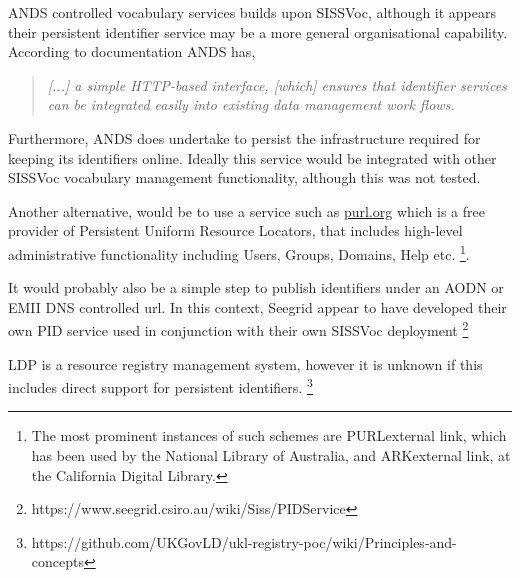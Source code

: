 \documentclass[10pt,a4paper]{article}
\newenvironment{italicquotes}
{\begin{quote}\itshape}
{\end{quote}}
\begin{document}
\begin{flushleft}
  \item ANDS controlled vocabulary services builds upon SISSVoc, although it appears
  their persistent identifier service may be a more general organisational capability. According to
  documentation ANDS has, 

  \begin{italicquotes} [...] a simple HTTP-based interface, [which] ensures that
  identifier services can be integrated easily into existing data management
  work flows.  \end{italicquotes}
  Furthermore, ANDS does undertake to persist the infrastructure required for
  keeping its identifiers online. Ideally this service would be integrated
  with other SISSVoc vocabulary management functionality, although this was not tested.

  \item[]Another alternative, would be to use a service such as \url{purl.org} which is a free provider 
  of Persistent Uniform Resource Locators, that includes high-level administrative functionality including 
  Users, Groups, Domains, Help etc.  \footnote{ 
  The most prominent instances of such schemes are PURLexternal link, which has been used
  by the National Library of Australia, and ARKexternal link, at the California
  Digital Library.  }. 

  \item[]It would probably also be a simple step to publish identifiers under an
  AODN or EMII DNS controlled url. In this context, Seegrid appear to have developed their own
  PID service used in conjunction with their own SISSVoc deployment  \footnote{
  https://www.seegrid.csiro.au/wiki/Siss/PIDService}  
  
  \item[]LDP is a resource registry management system, however it is unknown 
  if this includes direct support for persistent identifiers.
    \footnote{ 
    https://github.com/UKGovLD/ukl-registry-poc/wiki/Principles-and-concepts
  }


% 


% 
%   
% 
% 
% 



\end{flushleft}
\end{document}
